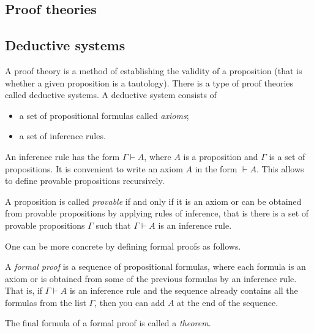 \begin{page}

\section{Proof theories}
\subsection{Deductive systems}
A proof theory is a method of establishing the validity of a proposition (that is whether a given proposition is a tautology).
There is a type of proof theories called deductive systems.
A deductive system consists of
\begin{itemize}
\item a set of propositional formulas called \emph{axioms};
\item a set of inference rules.
\end{itemize}

An inference rule has the form $\Gamma \vdash A$, where $A$ is a proposition and $\Gamma$ is a set of propositions.
It is convenient to write an axiom $A$ in the form $\vdash A$.
This allows to define provable propositions recursively.


\end{page}

\begin{page}

\begin{dfn}
A proposition is called \emph{provable} if and only if it is an axiom or can be obtained from provable propositions by applying rules of inference,
that is there is a set of provable propositions $\Gamma$ such that $\Gamma \vdash A$ is an inference rule.
\end{dfn}

\end{page}

\begin{page}


One can be more concrete by defining formal proofs as follows.

\end{page}

\begin{page}

\begin{dfn}
\label{dfn:HilbertProof}
A \emph{formal proof} is a sequence of propositional formulas,
where each formula is an axiom or is obtained from some of the previous formulas by an inference rule.
That is, if $\Gamma \vdash A$ is an inference rule and the sequence already contains all the formulas from the list $\Gamma$,
then you can add $A$ at the end of the sequence.

The final formula of a formal proof is called a \emph{theorem}.
\end{dfn}

\end{page}

